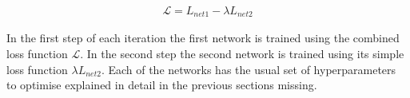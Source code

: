 \begin{align}
    \mathcal{L} = L_{net1} - \lambda L_{net2}
    \label{eq:adversarial_loss}
\end{align}

In the first step of each iteration the first network is trained using the combined loss function $\mathcal{L}$. In the second step the second network is trained using its simple loss function $\lambda L_{net2}$. Each of the networks has the usual set of hyperparameters to optimise explained in detail in the previous sections missing.



